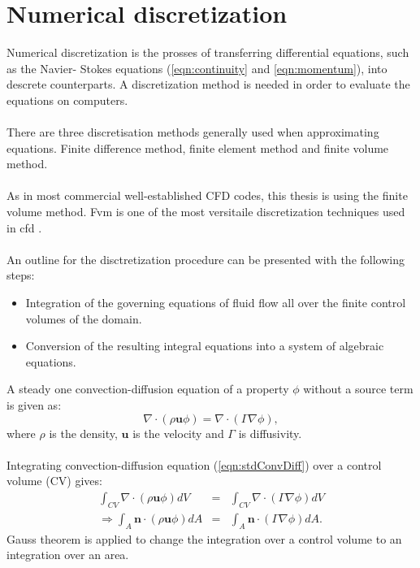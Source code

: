 \documentclass[a4paper, 12pt]{report}
\begin{document}
\section{Numerical discretization}
Numerical discretization is the prosses of transferring differential equations, such as the Navier- Stokes equations (\ref{eqn:continuity} and \ref{eqn:momentum}), into descrete counterparts.
A discretization method is needed in order to evaluate the equations on computers. \\
\\
There are three discretisation methods generally used when approximating equations. Finite difference method, finite element method and finite volume method.\\
\\
As in most commercial well-established CFD codes, this thesis is using the finite volume method. Fvm is one of the most versitaile discretization techniques used in cfd \cite{CFD}.\\
\\
An outline for the disctretization procedure can be presented with the following steps:
\begin{itemize}
\item Integration of the governing equations of fluid flow all over the finite control volumes of the domain.
\item Conversion of the resulting integral equations into a system of algebraic equations.
\end{itemize}
A steady one convection-diffusion equation of a property $\phi$ without a source term is given as:
\begin{equation}
\nabla \cdot (\rho \mathbf{u} \phi) =  \nabla \cdot (\Gamma \nabla \phi),
\label{eqn:stdConvDiff}
\end{equation}
where $\rho$ is the density, $\mathbf{u}$ is the velocity and $\Gamma$ is diffusivity.\\
\\
Integrating convection-diffusion equation (\ref{eqn:stdConvDiff}) over a control volume (CV) gives:
\begin{eqnarray}
\int_{CV} \nabla \cdot (\rho \mathbf{u} \phi) dV &=& \int_{CV} \nabla \cdot (\Gamma \nabla  \phi) dV \nonumber \\
\label{eqn:intStdConvDiff}
\Rightarrow \int_{A} \mathbf{n} \cdot (\rho \mathbf{u} \phi) dA &=& \int_{A} \mathbf{n} \cdot (\Gamma \nabla  \phi) dA.
\end{eqnarray}
Gauss theorem \cite{CFD} is applied to change the integration over a control volume to an integration over an area.
\end{document}
